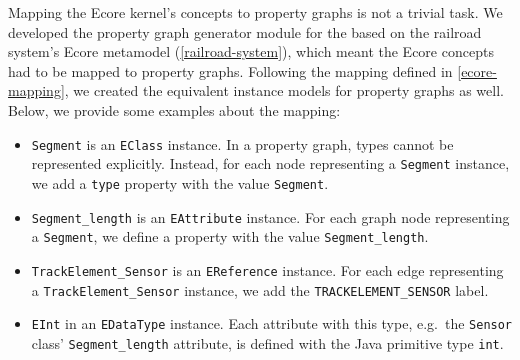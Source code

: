 Mapping the Ecore kernel's concepts to property graphs is not a trivial task. We developed the property graph generator module for the \tb{} based on the railroad system's Ecore metamodel (\autoref{railroad-system}), which meant the Ecore concepts had to be mapped to property graphs. Following the mapping defined in \autoref{ecore-mapping}, we created the equivalent instance models for property graphs as well. Below, we provide some examples about the mapping:
\begin{itemize}
  \item \verb+Segment+ is an \verb+EClass+ instance. In a property graph, types cannot be represented explicitly. Instead, for each node representing a \verb+Segment+ instance, we add a \verb+type+ property with the value \verb+Segment+.
  \item \verb+Segment_length+ is an \verb+EAttribute+ instance. For each graph node representing a \verb+Segment+, we define a property with the value \verb+Segment_length+.
  \item \verb+TrackElement_Sensor+ is an \verb+EReference+ instance. For each edge representing a \verb+TrackElement_Sensor+ instance, we add the \verb+TRACKELEMENT_SENSOR+ label.
  \item \verb+EInt+ in an \verb+EDataType+ instance. Each attribute with this type, e.g.\ the \verb+Sensor+ class' \verb+Segment_length+ attribute, is defined with the Java primitive type \verb+int+.
\end{itemize}

